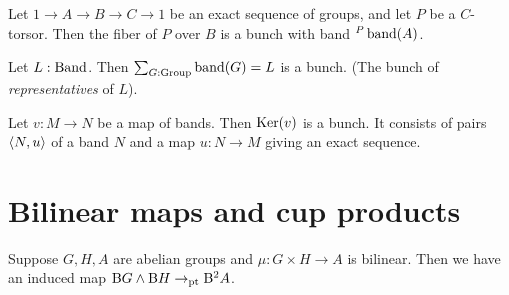 \begin{definition}
  Let $1\to A\to B\to C\to 1$ be an exact sequence of groups, and let
  $P$ be a $C$-torsor. Then the fiber of $P$ over $B$ is a bunch with
  band ${}^P\band(A)$.
\end{definition}

\begin{definition}
  Let $L : \mathrm{Band}$. Then $\sum_{G:\Group}\band(G)=L$ is a bunch. (The
  bunch of \emph{representatives} of $L$).
\end{definition}

\begin{definition} %
  Let $v : M \to N$ be a map of bands. Then $\Ker(v)$ is a bunch. It
  consists of pairs $\langle N,u\rangle$ of a band $N$ and a map $u:N\to M$
  giving an exact sequence.
\end{definition}

\section{Bilinear maps and cup products}

Suppose $G,H,A$ are abelian groups and $\mu : G \times H \to A$ is bilinear.
Then we have an induced map $\mathrm{B} G \wedge \mathrm{B} H \to_{\mathrm{pt}} \mathrm{B}^2A$.

